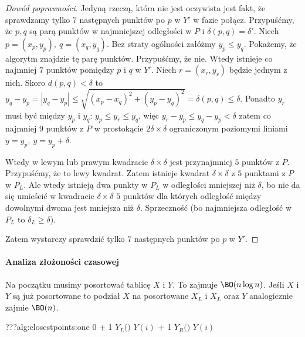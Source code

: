 \begin{proof}[Dowód poprawności]
	Jedyną rzeczą, która nie jest oczywista jest fakt, że sprawdzamy tylko $7$ następnych punktów po $p$ w $Y'$ w fazie połącz. 
	Przypuśćmy, że $p, q$ są parą punktów w najmniejszej odległości w $P$ i $\delta(p,q) = \delta'$. Niech 
	$p = (x_p, y_p),\ q = (x_q, y_q)$. Bez straty ogólności załóżmy $y_p \leq y_q$. Pokażemy, że algorytm znajdzie 
	tę parę punktów. Przypuśćmy, że nie. Wtedy istnieje co najmniej $7$ punktów pomiędzy $p$ i $q$ w $Y'$. 
	Niech $r = (x_r, y_r)$ będzie jednym z nich. Skoro $d(p,q) < \delta$ to 
	$y_q - y_p = |y_q - y_p| \leq \sqrt{(x_p - x_q)^2 + (y_p - y_q)^2} = \delta(p, q) \leq \delta$. 
	Ponadto $y_r$ musi być między $y_p$ i $y_q$: $y_p \leq y_r \leq y_q$, więc $y_r - y_p \leq y_q - y_p < \delta$ 
	zatem co najmniej 9 punktów z $P$ w prostokącie $2\delta\times\delta$ ograniczonym poziomymi liniami 
	$y = y_p,\ y = y_p + \delta$. 
	
	Wtedy w lewym lub prawym kwadracie $\delta\times\delta$ jest przynajmniej $5$ punktów z $P$. Przypuśćmy, 
	że to lewy kwadrat. Zatem istnieje kwadrat $\delta\times\delta$ z $5$ punktami z $P$ w $P_L$. 
	Ale wtedy istnieją dwa punkty w $P_L$ w odległości mniejszej niż $\delta$, bo nie da się umieścić 
	w kwadracie $\delta\times\delta$ $5$ punktów dla których odległość między dowolnymi dwoma 
	jest mniejsza niż $\delta$. Sprzeczność (bo najmniejsza odległość w $P_L$ to $\delta_L \geq \delta$). 
	
	Zatem wystarczy sprawdzić tylko $7$ następnych punktów po $p$ w $Y'$. 
\end{proof}

\paragraph{Analiza złożoności czasowej}
Na początku musimy posortować tablicę $X$ i $Y$. To zajmuje $\BO(n\log n)$. Jeśli $X$ i $Y$ są już posortowane 
to podział $X$ na posortowane $X_L$ i $X_L$ oraz $Y$ analogicznie zajmie $\BO(n)$. 

\begin{alg}{???}{alg:closestpoints:one}
	\State {} \Assign {} \Assign $0$
			\State {} \Assign {} + 1
			\State $Y_L($$)$ \Assign $Y(i)$
		\Else
			\State {} \Assign {} + 1
			\State $Y_R($$)$ \Assign $Y(i)$
		\EndIf
	\EndFor
\end{alg}

